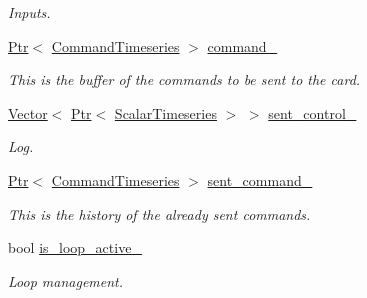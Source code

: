 \begin{DoxyCompactItemize}
\begin{DoxyCompactList}\small\item\em Inputs. \end{DoxyCompactList}\item 
\mbox{\label{classblmc__drivers_1_1CanBusMotorBoard_a720c6300bf07245a739713a209799c02}} 
\hyperlink{classblmc__drivers_1_1MotorBoardInterface_a6a733b7ed7a3a96f6b0712b6bb5307f8}{Ptr}$<$ \hyperlink{classblmc__drivers_1_1MotorBoardInterface_ae2afe94a023d9f08a4c689e9b7660f15}{Command\+Timeseries} $>$ \hyperlink{classblmc__drivers_1_1CanBusMotorBoard_a720c6300bf07245a739713a209799c02}{command\+\_\+}
\begin{DoxyCompactList}\small\item\em This is the buffer of the commands to be sent to the card. \end{DoxyCompactList}\item 
\hyperlink{classblmc__drivers_1_1MotorBoardInterface_abeb474bef6d85dffcd5227e5ea965cc5}{Vector}$<$ \hyperlink{classblmc__drivers_1_1MotorBoardInterface_a6a733b7ed7a3a96f6b0712b6bb5307f8}{Ptr}$<$ \hyperlink{classblmc__drivers_1_1MotorBoardInterface_a14e237254ba495a66091ea3a3a33fa75}{Scalar\+Timeseries} $>$ $>$ \hyperlink{classblmc__drivers_1_1CanBusMotorBoard_ab5296d55684d48b538844c3b96df6594}{sent\+\_\+control\+\_\+}
\begin{DoxyCompactList}\small\item\em Log. \end{DoxyCompactList}\item 
\mbox{\label{classblmc__drivers_1_1CanBusMotorBoard_a27712df32104357ac31b97179f1e9211}} 
\hyperlink{classblmc__drivers_1_1MotorBoardInterface_a6a733b7ed7a3a96f6b0712b6bb5307f8}{Ptr}$<$ \hyperlink{classblmc__drivers_1_1MotorBoardInterface_ae2afe94a023d9f08a4c689e9b7660f15}{Command\+Timeseries} $>$ \hyperlink{classblmc__drivers_1_1CanBusMotorBoard_a27712df32104357ac31b97179f1e9211}{sent\+\_\+command\+\_\+}
\begin{DoxyCompactList}\small\item\em This is the history of the already sent commands. \end{DoxyCompactList}\item 
bool \hyperlink{classblmc__drivers_1_1CanBusMotorBoard_ae25808cc09839c2574d134a36b5b4d5d}{is\+\_\+loop\+\_\+active\+\_\+}
\begin{DoxyCompactList}\small\item\em Loop management. \end{DoxyCompactList}\item 

\end{DoxyCompactItemize}
